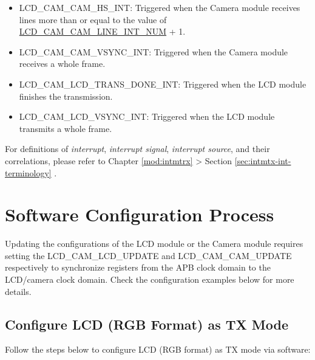 \documentclass[main\_\_EN.tex]{subfiles}
\begin{document}
\begin{itemize}
    \item \label{int:LCDCAMCAMHSINT}LCD\_CAM\_CAM\_HS\_INT: Triggered when the Camera module receives lines more than or equal to the value of \hyperref[fielddesc:LCDCAMCAMLINEINTNUM] {LCD\_CAM\_CAM\_LINE\_INT\_NUM} + 1.

    \item \label{int:LCDCAMCAMVSYNCINT}LCD\_CAM\_CAM\_VSYNC\_INT: Triggered when the Camera module receives a whole frame.
    \item \label{int:LCDCAMLCDTRANSDONEINT}LCD\_CAM\_LCD\_TRANS\_DONE\_INT: Triggered when the LCD module finishes the transmission.
    \item \label{int:LCDCAMLCDVSYNCINT}LCD\_CAM\_LCD\_VSYNC\_INT: Triggered when the LCD module transmits a whole frame.
\end{itemize}

\begin{tiplisting}
For definitions of \textit{interrupt}, \textit{interrupt signal}, \textit{interrupt source}, and their correlations, please refer to Chapter \ref{mod:intmtrx} \textit{} > Section \ref{sec:intmtx-int-terminology} \textit{}.
\end{tiplisting}
\vspace{-1em}
\section{Software Configuration Process}
\begin{tiplisting}
Updating the configurations of the LCD module or the Camera module requires setting the LCD\_CAM\_LCD\_UPDATE and LCD\_CAM\_CAM\_UPDATE respectively to synchronize registers from the APB clock domain to the LCD/camera clock domain. Check the configuration examples below for more details.
\end{tiplisting}
\vspace{-1em}
\subsection{Configure LCD (RGB Format) as TX Mode}

Follow the steps below to configure LCD (RGB format) as TX mode via software:
\end{document}
